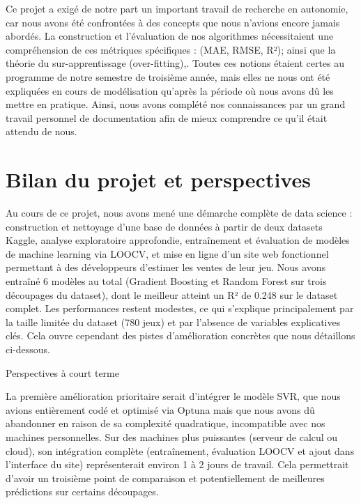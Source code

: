 \documentclass[mstat,12pt]{unswthesis}
\begin{document}
Ce projet a exigé de notre part un important travail de recherche en autonomie, car nous avons été confrontées à des concepts que nous n'avions encore jamais abordés. La construction et l'évaluation de nos algorithmes nécessitaient une compréhension de ces métriques spécifiques : (MAE, RMSE, R²); ainsi que la théorie du sur-apprentissage (over-fitting),. Toutes ces notions étaient certes au programme de notre semestre de troisième année, mais elles ne nous ont été expliquées en cours de modélisation qu’après la période où nous avons dû les mettre en pratique. Ainsi, nous avons complété nos connaissances par un grand travail personnel de documentation afin de mieux comprendre ce qu’il était attendu de nous.




\hypertarget{BilanDuProjetEtPerspectives}{%
\section{\textbf{Bilan du projet et perspectives}}\label{BilanDuProjetEtPerspectives}}

Au cours de ce projet, nous avons mené une démarche complète de data science : construction et nettoyage d'une base de données à partir de deux datasets Kaggle, analyse exploratoire approfondie, entraînement et évaluation de modèles de machine learning via LOOCV, et mise en ligne d'un site web fonctionnel permettant à des développeurs d'estimer les ventes de leur jeu. Nous avons entraîné 6 modèles au total (Gradient Boosting et Random Forest sur trois découpages du dataset), dont le meilleur atteint un R² de 0.248 sur le dataset complet.
Les performances restent modestes, ce qui s'explique principalement par la taille limitée du dataset (780 jeux) et par l'absence de variables explicatives clés. Cela ouvre cependant des pistes d'amélioration concrètes que nous détaillons ci-dessous.

Perspectives à court terme

La première amélioration prioritaire serait d'intégrer le modèle SVR, que nous avions entièrement codé et optimisé via Optuna mais que nous avons dû abandonner en raison de sa complexité quadratique, incompatible avec nos machines personnelles. Sur des machines plus puissantes (serveur de calcul ou cloud), son intégration complète (entraînement, évaluation LOOCV et ajout dans l'interface du site) représenterait environ 1 à 2 jours de travail. Cela permettrait d'avoir un troisième point de comparaison et potentiellement de meilleures prédictions sur certains découpages.
\end{document}
